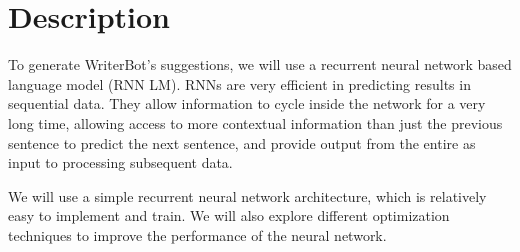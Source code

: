 \section{Description}\label{sec:description}
To generate WriterBot’s suggestions, we will use a recurrent neural network based
language model (RNN LM). RNNs are very efficient in predicting results in sequential
data. They allow information to cycle inside the network for a very long time,
allowing access to more contextual information than just the previous sentence
to predict the next sentence, and provide output from the entire as input to
processing subsequent data.

We will use a simple recurrent neural network architecture\cite{RNN_language_model},
which is relatively easy to implement and train. We will also explore different
optimization techniques to improve the performance of the neural network.
